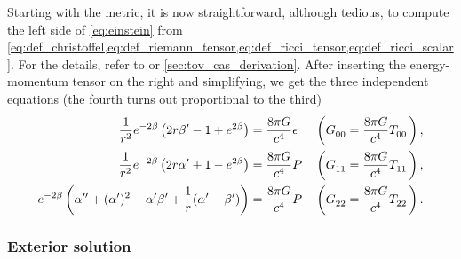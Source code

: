 Starting with the metric, it is now straightforward, although tedious, to compute the left side of \cref{eq:einstein} from \cref{eq:def_christoffel,eq:def_riemann_tensor,eq:def_ricci_tensor,eq:def_ricci_scalar}.
For the details, refer to \cite[equation 5.11-5.15]{ref:carroll} or \cref{sec:tov_cas_derivation}.
After inserting the energy-momentum tensor on the right and simplifying, we get the three independent equations
(the fourth turns out proportional to the third)
\begin{subequations}
\begin{align}
	\frac{1}{r^2} e^{-2 \beta} \left( 2 r \beta' - 1 + e^{2 \beta} \right)                               &= \frac{8 \pi G}{c^4} \epsilon
	&& \left( G\indices{_0_0} = \frac{8 \pi G}{c^4} T\indices{_0_0} \right) , \label{eq:einstein_to_tov:tt} \\
	\frac{1}{r^2} e^{-2 \beta} \left( 2 r \alpha' + 1 - e^{2 \beta} \right)                              &= \frac{8 \pi G}{c^4} P
	&& \left( G\indices{_1_1} = \frac{8 \pi G}{c^4} T\indices{_1_1} \right) , \label{eq:einstein_to_tov:rr} \\
	e^{-2 \beta} \left( \alpha'' + (\alpha')^2 - \alpha' \beta' + \frac{1}{r} (\alpha' - \beta') \right) &= \frac{8 \pi G}{c^4} P
	&& \left( G\indices{_2_2} = \frac{8 \pi G}{c^4} T\indices{_2_2} \right) . \label{eq:einstein_to_tov:thetatheta}
\end{align}
\label{eq:einstein_to_tov:einstein_equation_in_star}
\end{subequations}

\subsubsection{Exterior solution}

